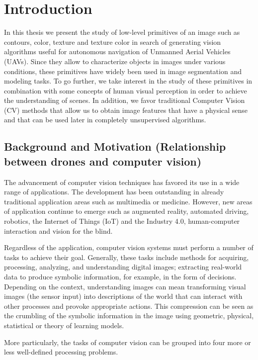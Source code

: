 \chapter*{Introduction}
In this thesis we present the study of low-level primitives of an image such as contours, color, texture and texture color in search of generating vision algorithms useful for autonomous navigation of Unmanned Aerial Vehicles (UAVs). Since they allow to characterize objects in images under various conditions, these primitives have widely been used in image segmentation and modeling tasks. To go further, we take interest in the study of these primitives in combination with some concepts of human visual perception in order to achieve the understanding of scenes. In addition, we favor traditional Computer Vision (CV) methods that allow us to obtain image features that have a physical sense and that can be used later in completely unsupervised algorithms.

\section*{Background and Motivation (Relationship between drones and computer vision)}

The advancement of computer vision techniques has favored its use in a wide range of applications. The development has been outstanding in already traditional application areas such as multimedia or medicine. However, new areas of application continue to emerge such as augmented reality, automated driving, robotics, the Internet of Things (IoT) and the Industry 4.0, human-computer interaction and vision for the blind. 

Regardless of the application, computer vision systems must perform a number of tasks to achieve their goal. Generally, these tasks include methods for acquiring, processing, analyzing, and understanding digital images; extracting real-world data to produce symbolic information, for example, in the form of decisions. Depending on the context, understanding images can mean transforming visual images (the sensor input) into descriptions of the world that can interact with other processes and provoke appropriate actions. This compression can be seen as the crumbling of the symbolic information in the image using geometric, physical, statistical or theory of learning models.

More particularly, the tasks of computer vision can be grouped into four more or less well-defined processing problems.

